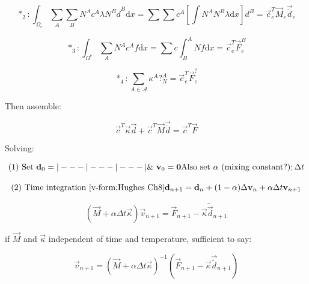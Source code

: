 \begin{equation}
*_2: \int_{\Omega_e} \sum_A \sum_B N^A c^A \lambda N^B \dot{d}^B \text{d}x = \sum\sum c^A \left[ \int N^A N^B \lambda \text{d}x \right] d^B = \vec{c}_e^T \vec{M}_e \vec{\dot{d}}_e
\end{equation}


\begin{equation}
*_3: \int_{\Omega^e} \sum_A N^A c^A f \text{d}x = \sum c \int_B^A N f \text{d}x = \vec{c}_e^T \vec{F}_e^B
\end{equation}


\begin{equation}
*_4: \sum_{A \in \mathcal{A}} \kappa^A ?_N^A = \vec{c}_e^T \vec{F}_e^?
\end{equation}


Then assemble:

\begin{equation}
\vec{c}^T \vec{\kappa} \vec{d} + \vec{c}^T \vec{M} \vec{\dot{d}} = \vec{c}^T \vec{F}
\end{equation}


Solving:

\begin{equation}
(1) \text{ Set } \vec{d}_0 = |---|---|---| \\
\&\ \vec{v}_0 = \vec{0} \\
\text{Also set } \alpha \text{ (mixing constant?)} ; \Delta t
\end{equation}


\begin{equation}
(2) \text{ Time integration [v-form;Hughes Ch8]} \\
\vec{d}_{n+1} = \vec{d}_n + (1-\alpha) \Delta \vec{v}_n + \alpha \Delta t \vec{v}_{n+1}
\end{equation}


\begin{equation}
(\vec{M} + \alpha\Delta t \vec{\kappa})\vec{v}_{n+1} = \vec{F}_{n+1} - \vec{\kappa} \tilde{\vec{d}}_{n+1}
\end{equation}


if $\vec{M}$ and $\vec{\kappa}$ independent of time and temperature, sufficient to say:

\begin{equation}
\vec{v}_{n+1} = (\vec{M}+\alpha\Delta t \vec{\kappa})^{-1} (\vec{F}_{n+1} - \vec{\kappa} \vec{\tilde{d}}_{n+1})
\end{equation}

